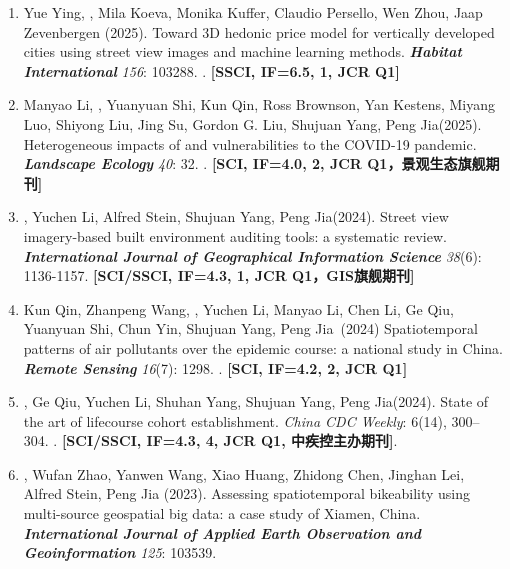 \begin{enumerate}
\item    
    Yue Ying, \Shaoqing\CS, Mila Koeva, Monika Kuffer, Claudio Persello, Wen Zhou, Jaap Zevenbergen (2025).
    Toward 3D hedonic price model for vertically developed cities using street view images and machine learning methods. 
    \textbf{\textit{Habitat International}} \textit{156}: 103288.
    .
    \textbf{[SSCI, IF=6.5, 1, JCR Q1]}
\item    
    Manyao Li\CF, \Shaoqing\CF, Yuanyuan Shi\CF, Kun Qin\CF, Ross Brownson, Yan Kestens, Miyang Luo, Shiyong Liu, Jing Su, Gordon G. Liu, Shujuan Yang\CS, Peng Jia\CS (2025).
    Heterogeneous impacts of and vulnerabilities to the COVID-19 pandemic. 
    \textbf{\textit{Landscape Ecology}} \textit{40}: 32.
    .
    \textbf{[SCI, IF=4.0, 2, JCR Q1，景观生态旗舰期刊]}
\item
    \Shaoqing, Yuchen Li, Alfred Stein, Shujuan Yang, Peng Jia\CS (2024).
    Street view imagery-based built environment auditing tools: a systematic review. 
    \textbf{\textit{International Journal of Geographical Information Science}} \textit{38}(6): 1136-1157.
    \textbf{[SCI/SSCI, IF=4.3, 1, JCR Q1，GIS旗舰期刊]}
\item
     Kun Qin\CF, Zhanpeng Wang\CF, \Shaoqing\CF, Yuchen Li, Manyao Li, Chen Li, Ge Qiu, Yuanyuan Shi, Chun Yin, Shujuan Yang, Peng Jia\CS \ (2024)
    Spatiotemporal patterns of air pollutants over the epidemic course: a national study in China. 
    \textbf{\textit{Remote Sensing}} \textit{16}(7): 1298.
    . 
    \textbf{[SCI, IF=4.2, 2, JCR Q1]}
\item
    \Shaoqing, Ge Qiu, Yuchen Li, Shuhan Yang, Shujuan Yang, Peng Jia\CS (2024).
    State of the art of lifecourse cohort establishment. 
    \textit{China CDC Weekly}: 6(14), 300–304.
    . 
    \textbf{[SCI/SSCI, IF=4.3, 4, JCR Q1, 中疾控主办期刊]}.
\item
    \Shaoqing, Wufan Zhao\CS, Yanwen Wang, Xiao Huang, Zhidong Chen, Jinghan Lei, Alfred Stein, Peng Jia (2023).
    Assessing spatiotemporal bikeability using multi-source geospatial big data: a case study of Xiamen, China. 
    \textbf{\textit{International Journal of Applied Earth Observation and Geoinformation}} \textit{125}: 103539.

\end{enumerate}
